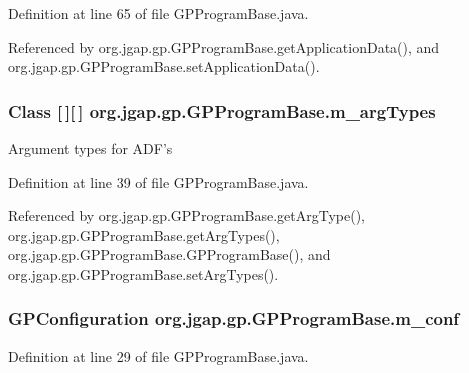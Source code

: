 Definition at line 65 of file G\-P\-Program\-Base.\-java.



Referenced by org.\-jgap.\-gp.\-G\-P\-Program\-Base.\-get\-Application\-Data(), and org.\-jgap.\-gp.\-G\-P\-Program\-Base.\-set\-Application\-Data().

\hypertarget{classorg_1_1jgap_1_1gp_1_1_g_p_program_base_a5360cf00e8d3559d8366a876596456d9}{
\subsubsection[{m\-\_\-arg\-Types}]{\setlength{\rightskip}{0pt plus 5cm}Class \mbox{[}$\,$\mbox{]}\mbox{[}$\,$\mbox{]} org.\-jgap.\-gp.\-G\-P\-Program\-Base.\-m\-\_\-arg\-Types\hspace{0.3cm}{\ttfamily [private]}}}\label{classorg_1_1jgap_1_1gp_1_1_g_p_program_base_a5360cf00e8d3559d8366a876596456d9}
Argument types for A\-D\-F's 

Definition at line 39 of file G\-P\-Program\-Base.\-java.



Referenced by org.\-jgap.\-gp.\-G\-P\-Program\-Base.\-get\-Arg\-Type(), org.\-jgap.\-gp.\-G\-P\-Program\-Base.\-get\-Arg\-Types(), org.\-jgap.\-gp.\-G\-P\-Program\-Base.\-G\-P\-Program\-Base(), and org.\-jgap.\-gp.\-G\-P\-Program\-Base.\-set\-Arg\-Types().

\hypertarget{classorg_1_1jgap_1_1gp_1_1_g_p_program_base_a3e354b60e3bffd4b0fd3763dffb1c926}{
\subsubsection[{m\-\_\-conf}]{\setlength{\rightskip}{0pt plus 5cm}G\-P\-Configuration org.\-jgap.\-gp.\-G\-P\-Program\-Base.\-m\-\_\-conf\hspace{0.3cm}{\ttfamily [private]}}}\label{classorg_1_1jgap_1_1gp_1_1_g_p_program_base_a3e354b60e3bffd4b0fd3763dffb1c926}


Definition at line 29 of file G\-P\-Program\-Base.\-java.



